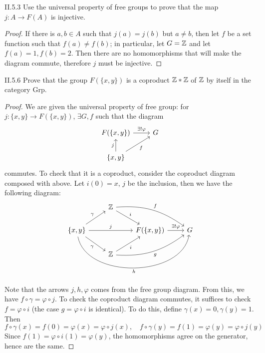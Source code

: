 \begin{problem}{II.5.3}
Use the universal property of free groups to prove that the map $j:A \to F(A)$ is injective.
\end{problem}
\begin{proof}
If there is $a,b \in A$ such that $j(a) = j(b)$ but $a \neq b$, then let $f$ be a set function such that $f(a) \neq f(b)$; in particular, let $G = \mathbb{Z}$ and let $f(a) = 1, f(b) = 2$. Then there are no homomorphisms that will make the diagram commute, therefore $j$ must be injective. 
\end{proof}

\begin{problem}{II.5.6}
Prove that the group $F(\{x,y\})$ is a coproduct $\mathbb{Z} * \mathbb{Z}$ of $\mathbb{Z}$ by itself in the category \textsf{Grp}.
\end{problem}
\begin{proof}
We are given the universal property of free group: for $j:\{x,y\} \to F(\{x,y\})$, $\exists G, f$ such that the diagram
\[
\begin{tikzcd}
{F(\{x,y\})} \arrow[r, "\exists ! \varphi"] & G \\
{\{x,y\}} \arrow[u, "j"] \arrow[ru, "f"']   &  
\end{tikzcd}
\]
commutes. To check that it is a coproduct, consider the coproduct diagram composed with above. Let $i(0)=x$, $j$ be the inclusion, then we have the following diagram:
\[
\begin{tikzcd}
& \Z \arrow[rd, "i"] \arrow[rrd, "f", bend left=20] &  &   \\
{\{x,y\}} \arrow[rr, "j"] \arrow[ru, "\gamma"] \arrow[rd, "\gamma"'] \arrow[rrr, "h"', bend right=80] &  & {F(\{x,y\})} \arrow[r, "\exists ! \varphi"] & G \\
& \Z \arrow[ru, "i"'] \arrow[rru, "g"', bend right=20]
\end{tikzcd}
\]
Note that the arrows $j, h, \varphi$ comes from the free group diagram. From this, we have $f \circ \gamma = \varphi \circ j$.
To check the coproduct diagram commutes, it suffices to check $f = \varphi \circ i$ (the case $g = \varphi \circ i$ is identical). To do this, define $\gamma(x) = 0, \gamma(y) = 1$. Then 
\[
f \circ \gamma (x) = f(0) = \varphi (x) = \varphi \circ j(x), \quad f \circ \gamma (y) = f(1) = \varphi (y) = \varphi \circ j(y)
\]
Since $f(1) = \varphi \circ i (1) = \varphi (y)$, the homomorphisms agree on the generator, hence are the same. 
\end{proof}

\section{}

